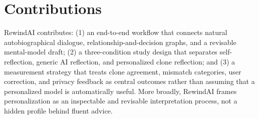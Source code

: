 \documentclass[sigconf,review,anonymous]{acmart}
\begin{document}
\section{Contributions}

RewindAI contributes: (1) an end-to-end workflow that connects natural autobiographical dialogue, relationship-and-decision graphs, and a revisable mental-model draft; (2) a three-condition study design that separates self-reflection, generic AI reflection, and personalized clone reflection; and (3) a measurement strategy that treats clone agreement, mismatch categories, user correction, and privacy feedback as central outcomes rather than assuming that a personalized model is automatically useful. More broadly, RewindAI frames personalization as an inspectable and revisable interpretation process, not a hidden profile behind fluent advice.

\clearpage


\end{document}
